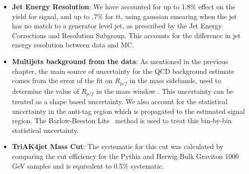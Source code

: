 \begin{itemize}
\item \textbf{Jet Energy Resolution}: We have accounted for up to 1.8\% effect on the yield for signal, and up to .7\% for tt, using gaussian smearing when the jet has no match to a generator level jet, as prescribed by the Jet Energy Corrections and Resolution Subgroup. This accounts for the difference in jet energy resolution between data and MC. 


\item \textbf{Multijets background from the data}: %
As mentioned in the previous chapter, the main source of uncertainty for the QCD background estimate comes from the error of the fit on $R_{p/f}$ in the mass sidebands, used to determine the value of $R_{p/f}$ in the mass window . This uncertainty can be treated as a shape based uncertainty. We also account for the statistical uncertainty in the anti-tag region which is propagated to the estimated signal region.
The Barlow-Beeston Lite~\cite{BBLite} method is used to treat this bin-by-bin statistical uncertainty. 

\item \textbf{TriAK4jet Mass Cut}: The systematic for this cut was calculated by comparing the cut efficiency for the Pythia and Herwig Bulk Graviton 1000 GeV samples and is equivalent to 0.5\% systematic. 


\end{itemize}

